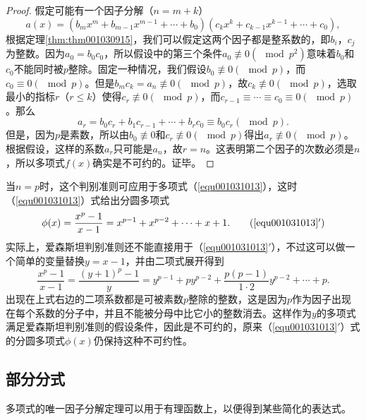 \begin{proof}
假定可能有一个因子分解（$n=m+k$）
\[
a(x)=(b_mx^m+b_{m-1}x^{m-1}+\cdots + b_0)(c_kx^k+c_{k-1}x^{k-1} + \cdots + c_0),
\]
根据定理\ref{thm:thm001030915}，我们可以假定这两个因子都是整系数的，即$b_i$，$c_j$为整数。因为$a_0=b_0c_0$，所以假设中的第三个条件$a_0 \not\equiv 0 (\mod{p^2})$意味着$b_0$和$c_0$不能同时被$p$整除。固定一种情况，我们假设$b_0 \not\equiv 0(\mod{p})$，而$c_0 \equiv 0(\mod{p})$。但是$b_mc_k = a_n \not\equiv 0(\mod{p})$，故$c_k \not\equiv 0(\mod{p})$，选取最小的指标$r$（$r \le k$）使得$c_r \not\equiv 0(\mod{p})$，而$c_{r-1}\equiv\cdots\equiv c_0 \equiv 0(\mod{p})$。那么
\[
a_r = b_0c_r + b_1c_{r-1} + \cdots + b_rc_0 \equiv b_0c_r(\mod{p}).
\]
但是，因为$p$是素数，所以由$b_0 \not\equiv 0$和$c_r \not\equiv 0(\mod{p})$得出$a_r \not\equiv 0(\mod{p})$。根据假设，这样的系数$a_r$只可能是$a_n$，故$r=n$。这表明第二个因子的次数必须是$n$，所以多项式$f(x)$确实是不可约的。证毕。
\end{proof}

当$n=p$时，这个判别准则可应用于多项式（\ref{equ001031013}），这时（\ref{equ001031013}）式给出分圆多项式
\begin{equation}
\phi(x)=\frac{x^p-1}{x-1}=x^{p-1}+x^{p-2}+\cdots +x+1. \tag{\ref{equ001031013}$'$}
\end{equation}
实际上，爱森斯坦判别准则还不能直接用于（\ref{equ001031013}$'$），不过这可以做一个简单的变量替换$y = x - 1$，并由二项式展开得到
\[
\frac{x^p-1}{x-1} = \frac{(y+1)^p-1}{y} = y^{p-1} + py^{p-2} + \frac{p(p-1)}{1 \cdot 2}y^{p-2} + \cdots + p.
\]
出现在上式右边的二项系数都是可被素数$p$整除的整数，这是因为$p$作为因子出现在每个系数的分子中，并且不能被分母中比它小的整数消去。这样作为$y$的多项式满足爱森斯坦判别准则的假设条件，因此是不可约的，原来（\ref{equ001031013}$'$）式的分圆多项式$\phi(x)$仍保持这种不可约性。


\subsection{部分分式}\label{subsection0010311}
多项式的唯一因子分解定理可以用于有理函数上，以便得到某些简化的表达式。







